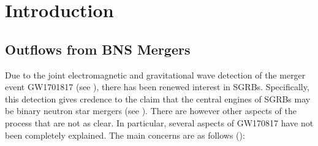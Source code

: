 \chapter{Introduction}\label{ch:introduction}

\section{Outflows from BNS Mergers}\label{sec:bns}
    Due to the joint electromagnetic and gravitational wave detection of the merger
    event GW1701817 (see \cite{abbott_2018}), there has been renewed interest in SGRBs.
    Specifically, this detection gives credence to the claim that the central engines of
    SGRBs may be binary neutron star mergers (see \cite{narayan_1992}). There are
    however other aspects of the process that are not as clear. In particular, several
    aspects of GW170817 have not been completely explained. The main concerns are as
    follows (\cite{lazzati_2020}):

